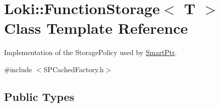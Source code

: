 \hypertarget{classLoki_1_1FunctionStorage}{}\section{Loki\+:\+:Function\+Storage$<$ T $>$ Class Template Reference}
\label{classLoki_1_1FunctionStorage}


Implementation of the Storage\+Policy used by \hyperlink{classLoki_1_1SmartPtr}{Smart\+Ptr}.  




{\ttfamily \#include $<$S\+P\+Cached\+Factory.\+h$>$}

\subsection*{Public Types}

